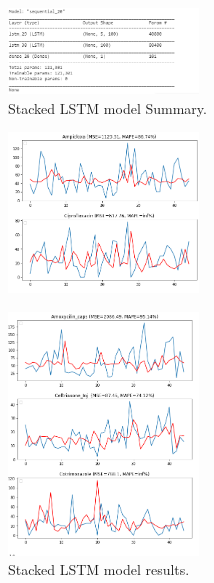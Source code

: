 \documentclass[12pt]{report}
\begin{document}
\begin{figure}[H]%
\begin {center}
\includegraphics[width=0.45\textwidth]{StackedLstm1.png}
\caption{Stacked LSTM model Summary.}
\label{fig:ecg}
\end {center}
\end{figure}


\begin{figure}[H]%
\begin {center}
\includegraphics[width=0.45\textwidth]{images/stacked (3).png}
\label{fig:ecg}
\end {center}
\end{figure}

\begin{figure}[H]%
\begin {center}
\includegraphics[width=0.45\textwidth]{images/stacked (2).png}
\caption{Stacked LSTM model results.}
\label{fig:ecg}
\end {center}
\end{figure}
\end{document}
